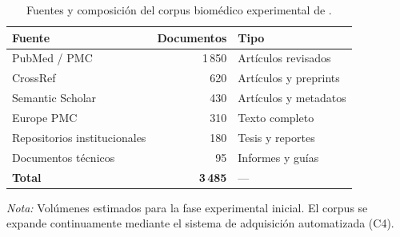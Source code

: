 
\begin{table}[!t]
\centering
\caption{Fuentes y composición del corpus biomédico experimental de \sirca{}.}
\label{tab:datasets}
\renewcommand{\arraystretch}{1.2}
\footnotesize
\begin{tabular}{l r l}
\toprule
\textbf{Fuente} & \textbf{Documentos} & \textbf{Tipo} \\
\midrule
PubMed / PMC                & 1\,850  & Artículos revisados \\
CrossRef                    & 620     & Artículos y preprints \\
Semantic Scholar            & 430     & Artículos y metadatos \\
Europe PMC                  & 310     & Texto completo \\
Repositorios institucionales & 180    & Tesis y reportes \\
Documentos técnicos         & 95      & Informes y guías \\
\midrule
\textbf{Total}              & \textbf{3\,485} & --- \\
\bottomrule
\end{tabular}
\vspace{0.5em}

\footnotesize
\textit{Nota:} Volúmenes estimados para la fase experimental inicial. El corpus se expande continuamente mediante el sistema de adquisición automatizada (C4).
\end{table}
